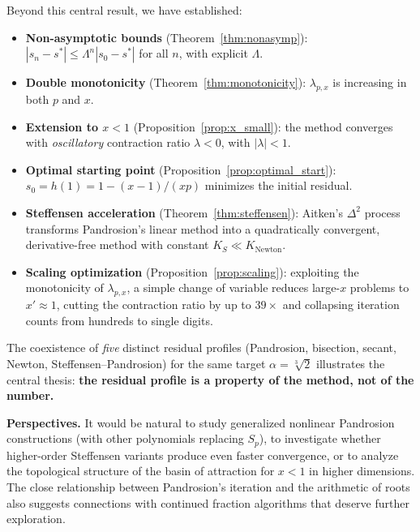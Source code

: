\documentclass[10pt,a4paper,oneside]{book}
\theoremstyle{definition}
\theoremstyle{remark}
\newcommand{\cbrt}[1]{\sqrt[3]{#1}}
\begin{document}
Beyond this central result, we have established:
\begin{itemize}
  \item \textbf{Non-asymptotic bounds} (Theorem~\ref{thm:nonasymp}): $|s_n - s^*| \leq \Lambda^n |s_0 - s^*|$ for all $n$, with explicit $\Lambda$.
  \item \textbf{Double monotonicity} (Theorem~\ref{thm:monotonicity}): $\lambda_{p,x}$ is increasing in both $p$ and $x$.
  \item \textbf{Extension to $x < 1$} (Proposition~\ref{prop:x_small}): the method converges with \emph{oscillatory} contraction ratio $\lambda < 0$, with $|\lambda| < 1$.
  \item \textbf{Optimal starting point} (Proposition~\ref{prop:optimal_start}): $s_0 = h(1) = 1 - (x-1)/(xp)$ minimizes the initial residual.
  \item \textbf{Steffensen acceleration} (Theorem~\ref{thm:steffensen}): Aitken's $\Delta^2$ process transforms Pandrosion's linear method into a quadratically convergent, derivative-free method with constant $K_S \ll K_{\text{Newton}}$.
  \item \textbf{Scaling optimization} (Proposition~\ref{prop:scaling}): exploiting the monotonicity of $\lambda_{p,x}$, a simple change of variable reduces large-$x$ problems to $x' \approx 1$, cutting the contraction ratio by up to $39\times$ and collapsing iteration counts from hundreds to single digits.
\end{itemize}

\medskip

The coexistence of \emph{five} distinct residual profiles (Pandrosion, bisection, secant, Newton, Steffensen--Pandrosion) for the same target $\alpha = \cbrt{2}$ illustrates the central thesis: \textbf{the residual profile is a property of the method, not of the number.}

\medskip

\textbf{Perspectives.} It would be natural to study generalized nonlinear Pandrosion constructions (with other polynomials replacing $S_p$), to investigate whether higher-order Steffensen variants produce even faster convergence, or to analyze the topological structure of the basin of attraction for $x < 1$ in higher dimensions. The close relationship between Pandrosion's iteration and the arithmetic of roots also suggests connections with continued fraction algorithms that deserve further exploration.
\end{document}
